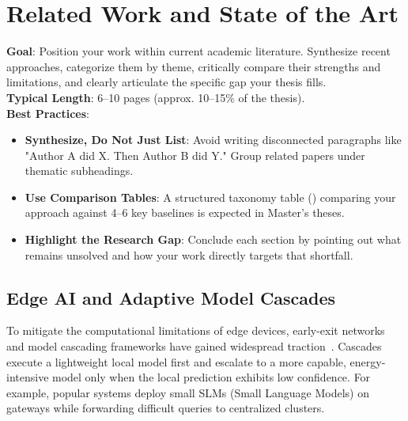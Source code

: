 
\chapter{Related Work and State of the Art}
\label{ch:related_work}

\begin{takeawaybox}
\textbf{Goal}: Position your work within current academic literature. Synthesize recent approaches, categorize them by theme, critically compare their strengths and limitations, and clearly articulate the specific gap your thesis fills.\\
\textbf{Typical Length}: 6--10 pages (approx. 10--15\% of the thesis).\\
\textbf{Best Practices}:
\begin{itemize}[leftmargin=*]
    \item \textbf{Synthesize, Do Not Just List}: Avoid writing disconnected paragraphs like "Author A did X. Then Author B did Y." Group related papers under thematic subheadings.
    \item \textbf{Use Comparison Tables}: A structured taxonomy table () comparing your approach against 4--6 key baselines is expected in Master's theses.
    \item \textbf{Highlight the Research Gap}: Conclude each section by pointing out what remains unsolved and how your work directly targets that shortfall.
\end{itemize}
\end{takeawaybox}

\section{Edge AI and Adaptive Model Cascades}
\label{sec:related_edge_cascades}

To mitigate the computational limitations of edge devices, early-exit networks and model cascading frameworks have gained widespread traction~\cite{pechlivanidou2022survey,shi2016edge,mao2017survey}. Cascades execute a lightweight local model first and escalate to a more capable, energy-intensive model only when the local prediction exhibits low confidence. For example, popular systems deploy small SLMs (Small Language Models) on gateways while forwarding difficult queries to centralized clusters.

